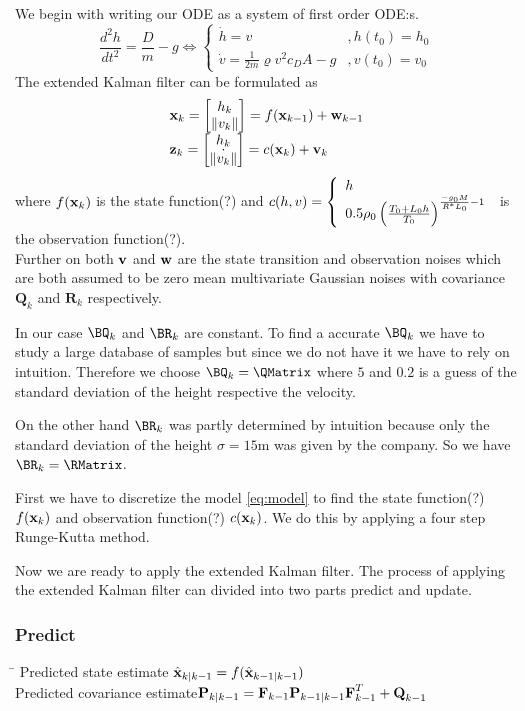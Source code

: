 We begin with writing our ODE as a system of first order ODE:s.
\begin{equation}
	\frac{d^2h}{dt^2} = \frac{D}{m} - g \Longleftrightarrow 
	\left\lbrace
	\begin{array}{ll}
		\dot{h}= v & , h(t_0)=h_0 \\
		\dot{v}= \frac{1}{2m}\varrho v^2c_DA-g& , v(t_0)=v_0
	\end{array}
	\right.
\end{equation}
The extended Kalman filter can be formulated as
\begin{equation*}\label{eq:model}
	\begin{array}{l}
		\textbf{x}_k = \left[ \begin{matrix} h_{k} \\ \| v_{k} \| \end{matrix}\right]= f(\textbf{x}_{k-1})+\textbf{w}_{k-1}\\
		\textbf{z}_k = \left[ \begin{matrix} h_{k} \\ \dot{\| v_{k} \|} \end{matrix}\right]=  c(\textbf{x}_k)+\textbf{v}_k
	\end{array}	
\end{equation*}
where $f(\textbf{x}_k)$ is the state function(?) and $c(h,v) = \left\lbrace \begin{array}{l} h \\ 0.5\rho_0\left(\frac{T_0+L_0h}{T_0}\right)^{\frac{-g_0M} {R^*L_0}-1} \end{array} \right.$ is the observation function(?). \\
Further on both $\textbf{v}$ and $\textbf{w}$ are the state transition and observation noises which are both assumed to be zero mean multivariate Gaussian noises with covariance $\textbf{Q}_k$ and $\textbf{R}_k$ respectively. 

In our case $\BQ_k$ and $\BR_k$ are constant. To find a accurate $\BQ_k$ we have to study a large database of samples but since we do not have it we have to rely on 
intuition. Therefore we choose $\BQ_k = \QMatrix$ where $5$ and $0.2$ is a guess of the standard deviation of the height respective the velocity. 

On the other hand $\BR_k$ was partly determined by intuition because only the standard deviation of the height $\sigma = 15$m was given by the company.  So we have $\BR_k = \RMatrix$.

First we have to discretize the model \eqref{eq:model} to find the state function(?) $f(\textbf{x}_k)$ and observation function(?) $c(\textbf{x}_k)$. We do this by applying a four step Runge-Kutta method. 

Now we are ready to apply the extended Kalman filter. The process of applying the extended Kalman filter can divided into two parts predict and update.\\

\subsubsection*{Predict}
\begin{tabbing}
\hspace{6cm}\=\kill
Predicted state estimate \> $\hat{\textbf{x}}_{k|k-1}=f(\hat{\textbf{x}}_{k-1|k-1})$ \\
Predicted covariance estimate\>$\textbf{P}_{k|k-1} = \textbf{F}_{k-1}\textbf{P}_{k-1|k-1}\textbf{F}_{k-1}^T+\textbf{Q}_{k-1}$
\end{tabbing}
